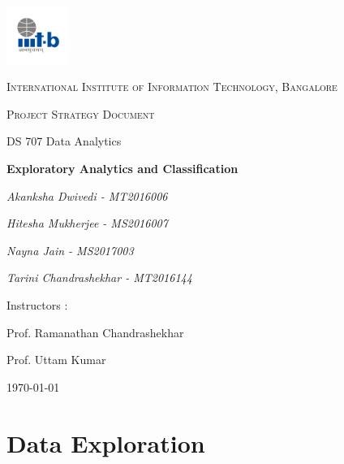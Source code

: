 \documentclass{article}
\begin{document}
\begin{titlepage}
	\centering
	\includegraphics[width=0.15\textwidth]{IIIT-B_logo.jpg}\par\vspace{1cm}
	{\scshape\LARGE International Institute of Information Technology, Bangalore \par}
	\vspace{1cm}
	{\scshape\Large Project Strategy Document\par}
	{\Large  DS 707 Data Analytics\par}
	\vspace{1.5cm}
	{\huge\bfseries Exploratory Analytics and Classification \par}
	\vspace{2cm}
	{\Large\itshape Akanksha Dwivedi - MT2016006\par}
	{\Large\itshape Hitesha Mukherjee - MS2016007\par}
	{\Large\itshape Nayna Jain - MS2017003\par}
	{\Large\itshape Tarini Chandrashekhar - MT2016144\par}
	\vfill
	Instructors : \par
	Prof. Ramanathan Chandrashekhar
	\par
	Prof. Uttam Kumar

	\vfill
	{\large \today\par}
\end{titlepage}

\newpage

\tableofcontents

\newpage
\justify


\section{Data Exploration}
\end{document}
